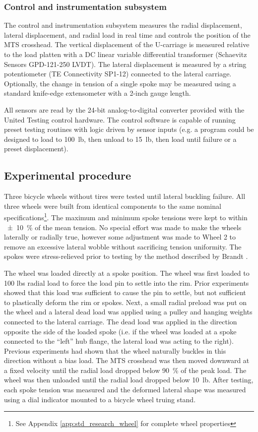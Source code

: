 \documentclass[\rootdir/thesis.tex]{subfiles}
\begin{document}
\subsubsection*{Control and instrumentation subsystem}
The control and instrumentation subsystem measures the radial displacement, lateral displacement, and radial load in real time and controls the position of the MTS crosshead. The vertical displacement of the U-carriage is measured relative to the load platten with a DC linear variable differential transformer (Schaevitz Sensors GPD-121-250 LVDT). The lateral displacement is measured by a string potentiometer (TE Connectivity SP1-12) connected to the lateral carriage. Optionally, the change in tension of a single spoke may be measured using a standard knife-edge extensometer with a 2-inch gauge length.

All sensors are read by the 24-bit analog-to-digital converter provided with the United Testing control hardware. The control software is capable of running preset testing routines with logic driven by sensor inputs (e.g. a program could be designed to load to \SI{100}{lb}, then unload to \SI{15}{lb}, then load until failure or a preset displacement).

\subsection{Experimental procedure}

Three bicycle wheels without tires were tested until lateral buckling failure. All three wheels were built from identical components to the same nominal specifications\footnote{See Appendix \ref{app:std_research_wheel} for complete wheel properties}. The maximum and minimum spoke tensions were kept to within \SI{+-10}{\percent} of the mean tension. No special effort was made to make the wheels laterally or radially true, however some adjustment was made to Wheel 2 to remove an excessive lateral wobble without sacrificing tension uniformity. The spokes were stress-relieved prior to testing by the method described by Brandt \cite{Brandt1993}.

The wheel was loaded directly at a spoke position. The wheel was first loaded to 100 lbs radial load to force the load pin to settle into the rim. Prior experiments showed that this load was sufficient to cause the pin to settle, but not sufficient to plastically deform the rim or spokes. Next, a small radial preload was put on the wheel and a lateral dead load was applied using a pulley and hanging weights connected to the lateral carriage. The dead load was applied in the direction opposite the side of the loaded spoke (i.e. if the wheel was loaded at a spoke connected to the ``left'' hub flange, the lateral load was acting to the right). Previous experiments had shown that the wheel naturally buckles in this direction without a bias load. The MTS crosshead was then moved downward at a fixed velocity until the radial load dropped below \SI{90}{\percent} of the peak load. The wheel was then unloaded until the radial load dropped below \SI{10}{lb}. After testing, each spoke tension was measured and the deformed lateral shape was measured using a dial indicator mounted to a bicycle wheel truing stand.
\end{document}
